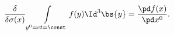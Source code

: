 \begin{equation}	\label{12.13}
\frac{\delta}{\delta\sigma(x)}
	\int\limits_{y^0=ct=\const}^{} f(y)\Id^3\bs{y}
=
\frac{\pd f(x)}{\pd x^0} .
	\end{equation}


